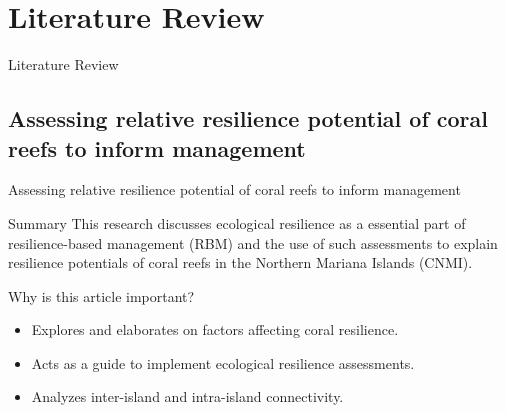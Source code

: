 \documentclass{beamer}
\begin{document}
\section{Literature Review}
\begin{frame}{Literature Review}
\end{frame}

\subsection{Assessing relative resilience potential of coral reefs to inform management}
\begin{frame}{Assessing relative resilience potential of coral reefs to inform management}
    \begin{block}{Summary}
        \small{This research discusses ecological resilience as a essential part of resilience-based management (RBM) and the use of such assessments to explain resilience potentials of coral reefs in the Northern Mariana Islands (CNMI).}
    \end{block}
    Why is this article important?
    \begin{itemize}
        \item Explores and elaborates on factors affecting coral resilience.
        \item Acts as a guide to implement ecological resilience assessments.
        \item Analyzes inter-island and intra-island connectivity.
    \end{itemize}
\end{frame}
\end{document}
